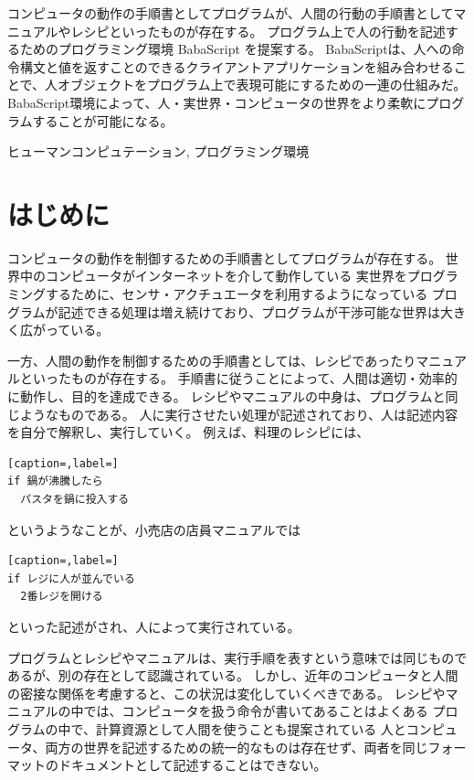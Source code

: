 \documentclass{deimj}
\begin{document}
\pagestyle{empty}
\begin{jabstract}
コンピュータの動作の手順書としてプログラムが、人間の行動の手順書としてマニュアルやレシピといったものが存在する。
プログラム上で人の行動を記述するためのプログラミング環境 BabaScript を提案する。
BabaScriptは、人への命令構文と値を返すことのできるクライアントアプリケーションを組み合わせることで、人オブジェクトをプログラム上で表現可能にするための一連の仕組みだ。
BabaScript環境によって、人・実世界・コンピュータの世界をより柔軟にプログラムすることが可能になる。
\end{jabstract}
\begin{jkeyword}
ヒューマンコンピュテーション, プログラミング環境
\end{jkeyword}
\maketitle

\section{はじめに}

コンピュータの動作を制御するための手順書としてプログラムが存在する。
世界中のコンピュータがインターネットを介して動作している
実世界をプログラミングするために、センサ・アクチュエータを利用するようになっている
プログラムが記述できる処理は増え続けており、プログラムが干渉可能な世界は大きく広がっている。

一方、人間の動作を制御するための手順書としては、レシピであったりマニュアルといったものが存在する。
手順書に従うことによって、人間は適切・効率的に動作し、目的を達成できる。
レシピやマニュアルの中身は、プログラムと同じようなものである。
人に実行させたい処理が記述されており、人は記述内容を自分で解釈し、実行していく。
例えば、料理のレシピには、

\begin{lstlisting}[caption=,label=]
if 鍋が沸騰したら
  パスタを鍋に投入する
\end{lstlisting}
    
というようなことが、小売店の店員マニュアルでは

\begin{lstlisting}[caption=,label=]
if レジに人が並んでいる
  2番レジを開ける
\end{lstlisting}
    
といった記述がされ、人によって実行されている。

プログラムとレシピやマニュアルは、実行手順を表すという意味では同じものであるが、別の存在として認識されている。
しかし、近年のコンピュータと人間の密接な関係を考慮すると、この状況は変化していくべきである。
レシピやマニュアルの中では、コンピュータを扱う命令が書いてあることはよくある
プログラムの中で、計算資源として人間を使うことも提案されている
人とコンピュータ、両方の世界を記述するための統一的なものは存在せず、両者を同じフォーマットのドキュメントとして記述することはできない。
\end{document}
